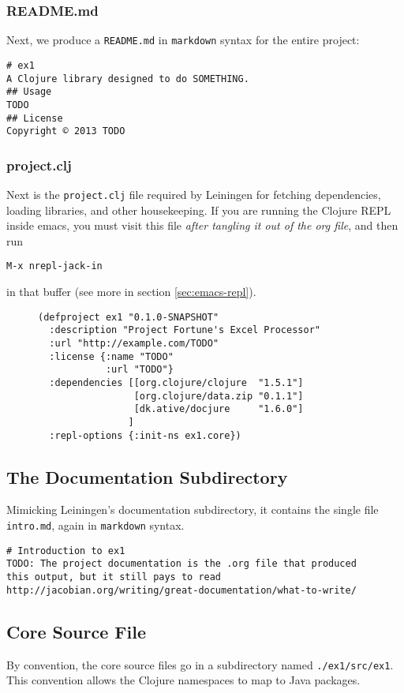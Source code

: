 \documentclass[11pt]{article}
\begin{document}
\subsubsection{README.md}
\label{sec-2-1-2}
Next, we produce a \verb+README.md+ in \verb+markdown+ syntax for
the entire project:
\begin{verbatim}
# ex1
A Clojure library designed to do SOMETHING.
## Usage
TODO
## License
Copyright © 2013 TODO
\end{verbatim}

\subsubsection{project.clj}
\label{sec-2-1-3}
Next is the \verb+project.clj+ file required by Leiningen for fetching
dependencies, loading libraries, and other housekeeping. If you are
running the Clojure REPL inside emacs, you must visit this file \emph{after
tangling it out of the org file}, and then run
\begin{verbatim}
M-x nrepl-jack-in
\end{verbatim}
in that buffer (see more in section
\ref{sec:emacs-repl}).
\begin{figure}[H]
\label{project-file}
\begin{verbatim}
(defproject ex1 "0.1.0-SNAPSHOT"
  :description "Project Fortune's Excel Processor"
  :url "http://example.com/TODO"
  :license {:name "TODO"
            :url "TODO"}
  :dependencies [[org.clojure/clojure  "1.5.1"]
                 [org.clojure/data.zip "0.1.1"]
                 [dk.ative/docjure     "1.6.0"]
                ]
  :repl-options {:init-ns ex1.core})
\end{verbatim}
\end{figure}
\subsection{The Documentation Subdirectory}
\label{sec-2-2}
Mimicking Leiningen's documentation subdirectory, it contains the
single file \verb+intro.md+, again in \verb+markdown+ syntax.
\begin{verbatim}
# Introduction to ex1
TODO: The project documentation is the .org file that produced
this output, but it still pays to read
http://jacobian.org/writing/great-documentation/what-to-write/
\end{verbatim}

\subsection{Core Source File}
\label{sec-2-3}
By convention, the core source files go in a subdirectory named
\verb+./ex1/src/ex1+. This convention allows the Clojure namespaces
to map to Java packages.
\end{document}

